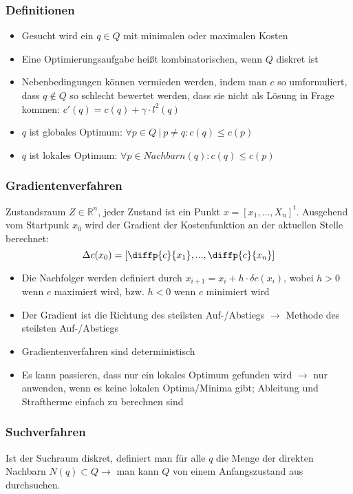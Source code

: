 \subsubsection{Definitionen}
\begin{itemize}
	\item Gesucht wird ein \(q \in Q\) mit minimalen oder maximalen Kosten
	\item Eine Optimierungsaufgabe heißt kombinatorischen, wenn \(Q\) diskret ist
	\item Nebenbedingungen können vermieden werden, indem man \(c\) so umformuliert, dass \(q \not\in Q\) so schlecht bewertet werden, dass sie nicht als Lösung in Frage kommen: \(c'(q) = c(q) + \gamma \cdot l^2(q)\)
	\item \(q\) ist globales Optimum: \(\forall p \in Q~|~p \ne q: c(q) \le c(p)\)
	\item \(q\) ist lokales Optimum: \(\forall p \in Nachbarn(q): c(q) \le c(p)\)
\end{itemize}

\subsubsection{Gradientenverfahren}
Zustandsraum \(Z \in \mathbb{R}^n\), jeder Zustand ist ein Punkt \(x = [x_1, ... , X_n]^t\).
Ausgehend vom Startpunk $x_0$ wird der Gradient der Kostenfunktion an der aktuellen Stelle berechnet:
\[\Delta c(x_0) = \left[ \diffp{c}{{x_{1}}}, ... , \diffp{c}{{x_{n}}} \right]\]

\begin{itemize}
	\item Die Nachfolger werden definiert durch \(x_{i+1} = x_i + h \cdot \delta c(x_i)\), wobei \(h > 0\) wenn \(c\) maximiert wird, bzw. \(h < 0\) wenn \(c\) minimiert wird
	\item Der Gradient ist die Richtung des steilsten Auf-/Abstiegs $\rightarrow$ Methode des steilsten Auf-/Abstiegs
	\item Gradientenverfahren sind deterministisch
	\item Es kann passieren, dass nur ein lokales Optimum gefunden wird \(\rightarrow\) nur anwenden, wenn es keine lokalen Optima/Minima gibt; Ableitung und Straftherme einfach zu berechnen sind
\end{itemize}

\subsubsection{Suchverfahren}
Ist der Suchraum diskret, definiert man für alle \(q\) die Menge der direkten Nachbarn \(N(q) \subset Q \rightarrow\) man kann \(Q\) von einem Anfangszustand aus durchsuchen.

